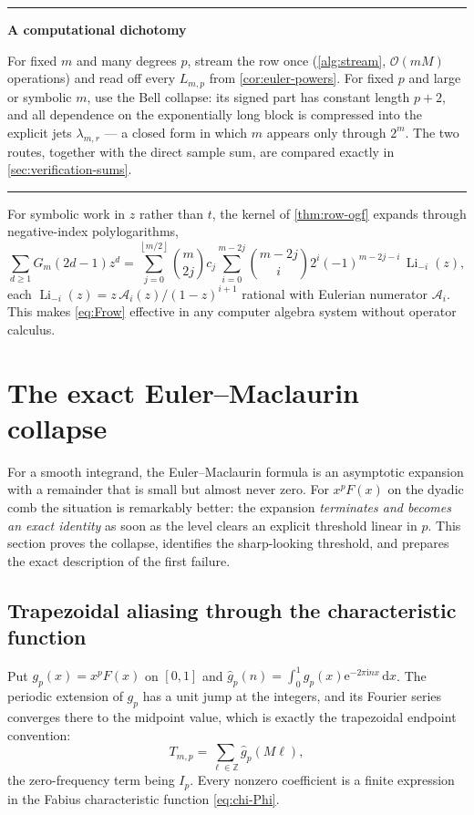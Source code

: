 \documentclass[11pt,oneside]{article}
\numberwithin{equation}{section}
\theoremstyle{definition}
\theoremstyle{remark}
\newcommand{\Z}{\mathbb Z}
\newcommand{\dd}{\,\mathrm d}
\newcommand{\e}{\mathrm e}
\newcommand{\ii}{\mathrm i}
\newcommand{\bigO}{\mathcal O}
\newcommand{\floor}[1]{\left\lfloor #1\right\rfloor}
\DeclareMathOperator{\Li}{Li}
\newenvironment{statusbox}[1]{%
  \par\smallskip\noindent\begin{center}\begin{minipage}{0.94\textwidth}%
  \hrule\vspace{0.5em}\noindent\textbf{#1}\par\smallskip
}{%
  \vspace{0.5em}\hrule\end{minipage}\end{center}\smallskip
}
\begin{document}
\begin{statusbox}{A computational dichotomy}
For fixed $m$ and many degrees $p$, stream the row once
(\cref{alg:stream}, $\bigO(mM)$ operations) and read off every
$L_{m,p}$ from \cref{cor:euler-powers}.  For fixed $p$ and large or
symbolic $m$, use the Bell collapse: its signed part has constant
length $p+2$, and all dependence on the exponentially long block is
compressed into the explicit jets $\lambda_{m,r}$ --- a closed form in
which $m$ appears only through $2^{m}$.  The two routes, together with
the direct sample sum, are compared exactly in
\cref{sec:verification-sums}.
\end{statusbox}

\begin{remark}
For symbolic work in $z$ rather than $t$, the kernel of
\cref{thm:row-ogf} expands through negative-index polylogarithms,
\begin{equation}
 \sum_{d\ge1}G_m(2d-1)z^{d}
 =\sum_{j=0}^{\floor{m/2}}\binom m{2j}c_j
 \sum_{i=0}^{m-2j}\binom{m-2j}{i}2^{i}(-1)^{m-2j-i}\,
 \Li_{-i}(z),
 \label{eq:B-polylog}
\end{equation}
each $\Li_{-i}(z)=z\,\mathcal A_i(z)/(1-z)^{i+1}$ rational with
Eulerian numerator $\mathcal A_i$.  This makes
\eqref{eq:Frow} effective in any computer algebra system without
operator calculus.
\end{remark}

\section{The exact Euler--Maclaurin collapse}
\label{sec:em}

For a smooth integrand, the Euler--Maclaurin formula is an asymptotic
expansion with a remainder that is small but almost never zero.  For
$x^{p}F(x)$ on the dyadic comb the situation is remarkably better: the
expansion \emph{terminates and becomes an exact identity} as soon as
the level clears an explicit threshold linear in $p$.  This section
proves the collapse, identifies the sharp-looking threshold, and
prepares the exact description of the first failure.

\subsection{Trapezoidal aliasing through the characteristic function}

Put $g_p(x)=x^{p}F(x)$ on $[0,1]$ and
$\widehat g_p(n)=\int_0^1g_p(x)\e^{-2\pi\ii nx}\dd x$.  The periodic
extension of $g_p$ has a unit jump at the integers, and its Fourier
series converges there to the midpoint value, which is exactly the
trapezoidal endpoint convention:
\begin{equation}
 T_{m,p}=\sum_{\ell\in\Z}\widehat g_p(M\ell),
 \label{eq:trap-alias}
\end{equation}
the zero-frequency term being $I_p$.  Every nonzero coefficient is a
finite expression in the Fabius characteristic function
\eqref{eq:chi-Phi}.
\end{document}
